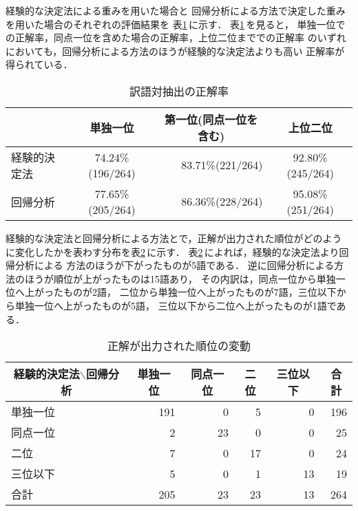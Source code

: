 経験的な決定法による重みを用いた場合と
回帰分析による方法で決定した重みを用いた場合のそれぞれの評価結果を
表\ref{tab:result}\,に示す．
表\ref{tab:result}\,を見ると，
単独一位での正解率，同点一位を含めた場合の正解率，上位二位まででの正解率
のいずれにおいても，回帰分析による方法のほうが経験的な決定法よりも高い
正解率が得られている．
\begin{table}[htbp]
\caption{訳語対抽出の正解率}
\label{tab:result}
\begin{center}
\begin{tabular}{|l||c|r|c|}\hline
         & 単独一位         & \multicolumn{1}{c|}{第一位(同点一位を含む)} & 上位二位 \\\hline\hline
経験的決定法   & 74.24\%(196/264) & 83.71\%(221/264)       & 92.80\%(245/264)\\\hline
回帰分析 & 77.65\%(205/264) & 86.36\%(228/264)       & 95.08\%(251/264)\\\hline
\end{tabular}
\end{center}
\end{table}

経験的な決定法と回帰分析による方法とで，正解が出力された順位がどのよう
に変化したかを表わす分布を表\ref{tab:rank_change}\,に示す． 
表\ref{tab:rank_change}\,によれば，経験的な決定法より回帰分析による
方法のほうが下がったものが5語である． 
逆に回帰分析による方法のほうが順位が上がったものは15語あり，
その内訳は，同点一位から単独一位へ上がったものが2語，
二位から単独一位へ上がったものが7語，三位以下から単独一位へ上がったものが5語，
三位以下から二位へ上がったものが1語である．
\begin{table}[htbp]
\caption{正解が出力された順位の変動}
\label{tab:rank_change}
\begin{center}
\begin{tabular}{|l||r|r|r|r|r|}\hline
\multicolumn{1}{|c||}{経験的決定法$\backslash$回帰分析}
& \multicolumn{1}{c|}{単独一位} & \multicolumn{1}{c|}{同点一位}
& \multicolumn{1}{c|}{二位} & \multicolumn{1}{c|}{三位以下} 
& \multicolumn{1}{c|}{合計} \\\hline\hline
単独一位 & 191 &  0 &  5 &  0 & 196 \\
同点一位 &   2 & 23 &  0 &  0 &  25 \\
二位     &   7 &  0 & 17 &  0 &  24 \\
三位以下 &   5 &  0 &  1 & 13 &  19 \\\hline
合計     & 205 & 23 & 23 & 13 & 264 \\\hline
\end{tabular}
\end{center}
\end{table}


